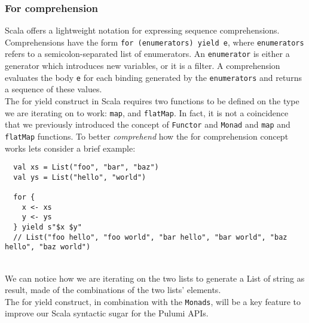       

\subsubsection{For comprehension}
Scala offers a lightweight notation for expressing \gls{sequence comprehension}s.
Comprehensions have the form \texttt{for (enumerators) yield e}, where \texttt{enumerators} refers to a semicolon-separated list of enumerators.
An \texttt{enumerator} is either a generator which introduces new variables, or it is a filter.
A comprehension evaluates the body \texttt{e} for each binding generated by the \texttt{enumerators} and returns a sequence of these values.\\
The for yield construct in Scala requires two functions to be defined on the type we are iterating on to work: \texttt{map}, and \texttt{flatMap}.
In fact, it is not a coincidence that we previously introduced the concept of \texttt{Functor} and \texttt{Monad} and \texttt{map} and \texttt{flatMap} functions.
To better \textit{comprehend} how the for comprehension concept works lets consider a brief example:
\begin{verbatim}
  val xs = List("foo", "bar", "baz")
  val ys = List("hello", "world")

  for {
    x <- xs
    y <- ys
  } yield s"$x $y"
  // List("foo hello", "foo world", "bar hello", "bar world", "baz hello", "baz world")
\end{verbatim}\mbox{}\\
We can notice how we are iterating on the two lists to generate a List of string as result, made of the combinations of the two lists' elements.\\
The for yield construct, in combination with the \texttt{Monads}, will be a key feature to improve our Scala syntactic sugar for the Pulumi APIs.




